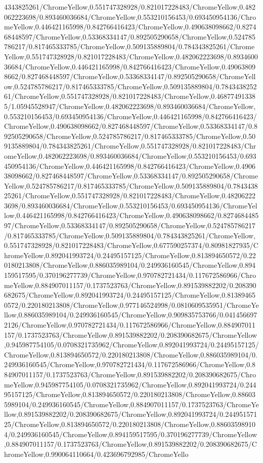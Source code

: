 {\begin{tikzternal}
{4343825261/ChromeYellow,0.551747328928/0.821017228483/ChromeYellow,0.482062223698/0.893460036684/ChromeYellow,0.553210156453/0.693450954136/ChromeYellow,0.446421165998/0.842766416423/ChromeYellow,0.490638098662/0.827468448597/ChromeYellow,0.53368334147/0.892505290658/ChromeYellow,0.524785786217/0.817465333785/ChromeYellow,0.509135889804/0.784343825261/ChromeYellow,0.551747328928/0.821017228483/ChromeYellow,0.482062223698/0.893460036684/ChromeYellow,0.446421165998/0.842766416423/ChromeYellow,0.490638098662/0.827468448597/ChromeYellow,0.53368334147/0.892505290658/ChromeYellow,0.524785786217/0.817465333785/ChromeYellow,0.509135889804/0.784343825261/ChromeYellow,0.551747328928/0.821017228483/ChromeYellow,0.468774913385/1.05945528947/ChromeYellow,0.482062223698/0.893460036684/ChromeYellow,0.553210156453/0.693450954136/ChromeYellow,0.446421165998/0.842766416423/ChromeYellow,0.490638098662/0.827468448597/ChromeYellow,0.53368334147/0.892505290658/ChromeYellow,0.524785786217/0.817465333785/ChromeYellow,0.509135889804/0.784343825261/ChromeYellow,0.551747328928/0.821017228483/ChromeYellow,0.482062223698/0.893460036684/ChromeYellow,0.553210156453/0.693450954136/ChromeYellow,0.446421165998/0.842766416423/ChromeYellow,0.490638098662/0.827468448597/ChromeYellow,0.53368334147/0.892505290658/ChromeYellow,0.524785786217/0.817465333785/ChromeYellow,0.509135889804/0.784343825261/ChromeYellow,0.551747328928/0.821017228483/ChromeYellow,0.482062223698/0.893460036684/ChromeYellow,0.553210156453/0.693450954136/ChromeYellow,0.446421165998/0.842766416423/ChromeYellow,0.490638098662/0.827468448597/ChromeYellow,0.53368334147/0.892505290658/ChromeYellow,0.524785786217/0.817465333785/ChromeYellow,0.509135889804/0.784343825261/ChromeYellow,0.551747328928/0.821017228483/ChromeYellow,0.677590257374/0.80981827935/ChromeYellow,0.892041993724/0.24495157125/ChromeYellow,0.813894650572/0.220180213808/ChromeYellow,0.886035989104/0.249936160545/ChromeYellow,0.894159517595/0.370196277739/ChromeYellow,0.970782721434/0.117672586966/ChromeYellow,0.884907011157/0.1737523763/ChromeYellow,0.891539882202/0.208390682675/ChromeYellow,0.892041993724/0.24495157125/ChromeYellow,0.813894650572/0.220180213808/ChromeYellow,0.977146524998/0.0810609535951/ChromeYellow,0.886035989104/0.249936160545/ChromeYellow,0.909835753766/0.0414566972126/ChromeYellow,0.970782721434/0.117672586966/ChromeYellow,0.884907011157/0.1737523763/ChromeYellow,0.891539882202/0.208390682675/ChromeYellow,0.945987754105/0.0708321735962/ChromeYellow,0.892041993724/0.24495157125/ChromeYellow,0.813894650572/0.220180213808/ChromeYellow,0.886035989104/0.249936160545/ChromeYellow,0.970782721434/0.117672586966/ChromeYellow,0.884907011157/0.1737523763/ChromeYellow,0.891539882202/0.208390682675/ChromeYellow,0.945987754105/0.0708321735962/ChromeYellow,0.892041993724/0.24495157125/ChromeYellow,0.813894650572/0.220180213808/ChromeYellow,0.886035989104/0.249936160545/ChromeYellow,0.884907011157/0.1737523763/ChromeYellow,0.891539882202/0.208390682675/ChromeYellow,0.892041993724/0.24495157125/ChromeYellow,0.813894650572/0.220180213808/ChromeYellow,0.886035989104/0.249936160545/ChromeYellow,0.894159517595/0.370196277739/ChromeYellow,0.884907011157/0.1737523763/ChromeYellow,0.891539882202/0.208390682675/ChromeYellow,0.990064110664/0.423696792985/ChromeYello}
\end{tikzternal}}
